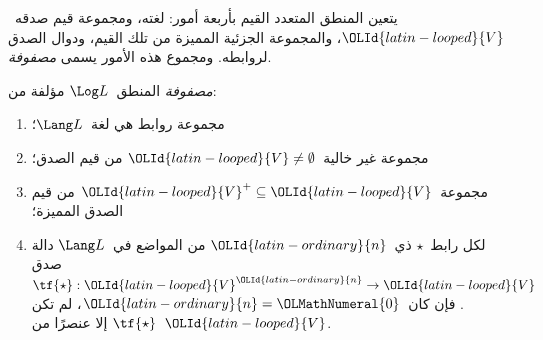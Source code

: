 \documentclass[../../../include/open-logic-section]{subfiles}
\begin{document}


يتعين المنطق المتعدد القيم بأربعة أمور: لغته، ومجموعة قيم صدقه~${\OLId{latin-looped}{V}}$،
والمجموعة الجزئية المميزة من تلك القيم، ودوال الصدق لروابطه. ومجموع
هذه الأمور يسمى \emph{مصفوفة}.

\begin{defn}[المصفوفة]
\emph{مصفوفة} المنطق~$\Log L$ مؤلفة من:
\begin{enumerate}
\item مجموعة روابط هي لغة~$\Lang L$؛
\item مجموعة غير خالية~${\OLId{latin-looped}{V}} \neq \emptyset$ من قيم الصدق؛
\item مجموعة~${\OLId{latin-looped}{V}}^+ \subseteq {\OLId{latin-looped}{V}}$ من قيم الصدق المميزة؛
\item لكل رابط~$\star$ ذي~${\OLId{latin-ordinary}{n}}$ من المواضع في~$\Lang L$ دالة صدق
$\tf{\star} : {\OLId{latin-looped}{V}}^{\OLId{latin-ordinary}{n}} \to {\OLId{latin-looped}{V}}$. فإن كان~${\OLId{latin-ordinary}{n}} = {\OLMathNumeral{0}}$، لم تكن
$\tf{\star}$ إلا عنصرًا من~${\OLId{latin-looped}{V}}$.
\end{enumerate}
\end{defn}
\end{document}
